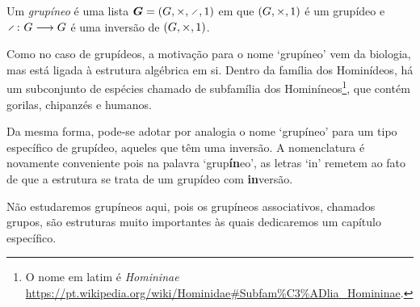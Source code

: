 \begin{definition}
Um \emph{grupíneo} é uma lista $\bm G = (G,\times,\div,\id)$ em que $(G,\times,1)$ é um grupídeo e $\fun{\div}{G}{G}$ é uma inversão de $(G,\times,1)$.
\end{definition}

Como no caso de grupídeos, a motivação para o nome `grupíneo' vem da biologia, mas está ligada à estrutura algébrica em si. Dentro da família dos Hominídeos, há um subconjunto de espécies chamado de subfamília dos Hominíneos\footnote{O nome em latim é \textit{Homininae} \url{https://pt.wikipedia.org/wiki/Hominidae\#Subfam\%C3\%ADlia_Homininae}.}, que contém gorilas, chipanzés e humanos.

Da mesma forma, pode-se adotar por analogia o nome `grupíneo' para um tipo específico de grupídeo, aqueles que têm uma inversão. A nomenclatura é novamente conveniente pois na palavra `grup\textbf{ín}eo', as letras `in' remetem ao fato de que a estrutura se trata de um grupídeo com \textbf{in}versão.

Não estudaremos grupíneos aqui, pois os grupíneos associativos, chamados grupos, são estruturas muito importantes às quais dedicaremos um capítulo específico.

